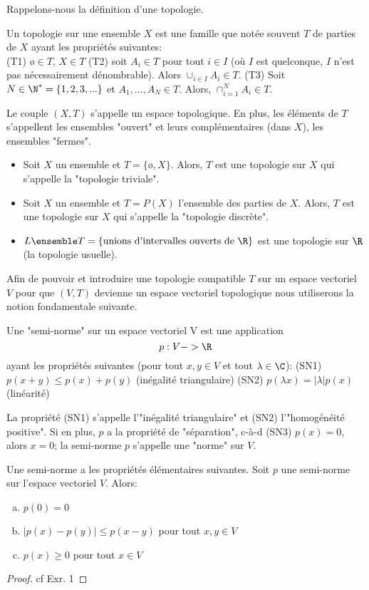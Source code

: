 Rappelons-nous la définition d'une topologie.

\begin{definition}
	Un topologie sur une ensemble $X$ est une famille que notée souvent $T$ de parties de $X$ ayant les propriétés suivantes:\\
	(T1) $ø\in T$, $X\in T$
	(T2) soit $A_i\in T$ pour tout $i \in I$ (où $I$ est quelconque, $I$ n'est pas nécessairement dénombrable). Alors $\cup_{i\in I}A_i\in T$.
	(T3) Soit $N\in \N^*=\{1, 2, 3,...\}$ et $A_1,..., A_N\in T$. Alors, $\cap_{i=1}^NA_i\in T$.

	Le couple $(X, T)$ s'appelle un espace topologique. En plus, les éléments de $T$ s'appellent les ensembles "ouvert" et leurs complémentaires (dans $X$), les ensembles "fermes". 
\end{definition}

\begin{example}
	\begin{itemize}[(a)]
		\item Soit $X$ un ensemble et $T=\{ø,X\}$. Alors, $T$ est une topologie sur $X$ qui s'appelle la "topologie triviale".
		\item Soit $X$ un ensemble et $T=P(X)$ l'ensemble des parties de $X$. Alors, $T$ est une topologie sur $X$ qui s'appelle la "topologie discrète".
		\item $L\ensemble T=\{\text{unions d'intervalles ouverts de $\R$}\}$ est une topologie sur $\R$ (la topologie usuelle).
	\end{itemize}
\end{example}

Afin de pouvoir et introduire une topologie compatible $T$ sur un espace vectoriel $V$ pour que $(V, T)$ devienne un espace vectoriel topologique nous utiliserons la notion fondamentale suivante.

\begin{definition} %
	Une "semi-norme" sur un espace vectoriel V est une application
		\[p:V-> \R\]
	ayant les propriétés suivantes (pour tout $x,y\in V$ et tout $\lambda\in\C$):
	(SN1) $p(x+y)≤p(x)+p(y)$ (inégalité triangulaire)
	(SN2) $p(\lambda x)=|\lambda|p(x)$ (linéarité)
	
	La propriété (SN1) s'appelle l'"inégalité triangulaire" et (SN2) l'"homogénéité positive".
	Si en plus, $p$ a la propriété de "séparation", c-à-d 
	(SN3) $p(x)=0$, alors $x=0$; 
	la semi-norme $p$ s'appelle une "norme" sur $V$.
\end{definition}

\begin{proposition} %
	Une semi-norme a les propriétés élémentaires suivantes.
	Soit $p$ une semi-norme sur l'espace vectoriel $V$. Alors:
	\begin{enumerate}[(a)]
		\item $p(0)=0$
		\item $|p(x)-p(y)|≤p(x-y)$ pour tout $x,y\in V$
		\item $p(x)≥0$ pour tout $x\in V$
	\end{enumerate}
\end{proposition}
\begin{proof}
	cf Exr. 1
\end{proof}

